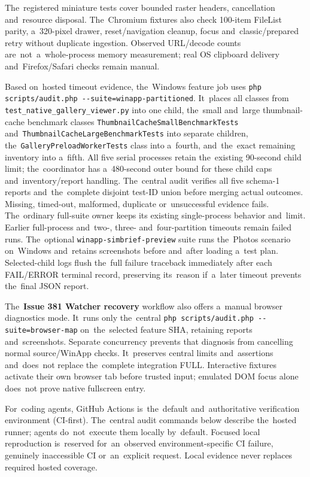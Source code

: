\documentclass[11pt,a4paper]{article}
\newcommand{\ui}[1]{\textbf{#1}}
\newcommand{\codeword}[1]{\nolinkurl{#1}}
\begin{document}
The~registered miniature tests cover bounded raster headers, cancellation
and~resource disposal. The~Chromium fixtures also check 100-item FileList
parity, a~320-pixel drawer, reset/navigation cleanup, focus and~classic/prepared
retry without duplicate ingestion. Observed URL/decode counts
are~not~a~whole-process memory measurement; real OS clipboard delivery
and~Firefox/Safari checks remain manual.

Based on~hosted timeout evidence, the~Windows feature job uses
\codeword{php scripts/audit.php --suite=winapp-partitioned}. It~places all
classes from \codeword{test_native_gallery_viewer.py} into one child, the~small and~large
thumbnail-cache benchmark classes \codeword{ThumbnailCacheSmallBenchmarkTests}
and~\codeword{ThumbnailCacheLargeBenchmarkTests} into separate children,
the~\codeword{GalleryPreloadWorkerTests} class into a~fourth, and~the~exact
remaining inventory into a~fifth. All five serial processes retain the~existing
90-second child limit; the~coordinator has a~480-second outer bound for these
child caps and~inventory/report handling. The~central
audit verifies all five schema-1 reports and~the~complete disjoint test-ID
union before merging actual outcomes. Missing, timed-out, malformed, duplicate
or~unsuccessful evidence fails. The~ordinary full-suite owner keeps its
existing single-process behavior and~limit. Earlier full-process and~two-,
three- and~four-partition timeouts remain failed runs.
The~optional \codeword{winapp-simbrief-preview} suite runs the~Photos scenario
on~Windows and~retains screenshots before and~after loading a~test plan.
Selected-child logs flush the~full failure traceback immediately after each
FAIL/ERROR terminal record, preserving its~reason if~a~later timeout prevents
the~final JSON report.

The~\ui{Issue 381 Watcher recovery} workflow also offers a~manual browser
diagnostics mode. It~runs only the~central
\codeword{php scripts/audit.php --suite=browser-map} on~the~selected feature
SHA, retaining reports and~screenshots. Separate concurrency prevents that
diagnosis from cancelling normal source/WinApp checks. It~preserves central
limits and~assertions and~does~not replace the~complete integration FULL.
Interactive fixtures activate their own browser tab before trusted input;
emulated DOM focus alone does~not prove native fullscreen entry.

For~coding agents, GitHub Actions is~the~default and~authoritative verification
environment (CI-first). The~central audit commands below describe the~hosted
runner; agents do~not~execute them locally by~default. Focused local
reproduction is~reserved for~an~observed environment-specific CI failure,
genuinely inaccessible CI or~an~explicit request. Local evidence never replaces
required hosted coverage.
\end{document}
